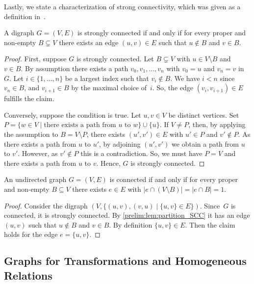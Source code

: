 Lastly, we state a characterization of strong connectivity, which was given as a definition in~\cite[Def.~2]{DBLP:journals/jalc/GonzeJ19}.

\begin{lemma}
	\label{prelim:lem:partition_SCC}
	A digraph $G = (V, E)$ is strongly connected if and only if for
	every proper and non-empty $B \subsetneq V$
	there exists an edge $(u,v) \in E$ such that $u \notin B$ and $v \in B$. 
\end{lemma}
\begin{proof}
	First, suppose $G$ is strongly connected. Let $B \subsetneq V$
	with $u \in V \setminus B$ and~$v \in B$.
	By assumption there exists a path $v_0, v_1, \ldots, v_n$
	with $v_0 = u$ and $v_n = v$ in $G$.
	Let $i \in \{1,\ldots,n\}$
	be a largest index such that $v_{i} \notin B$.
	We have $i < n$ since $v_n \in B$, 
	and $v_{i+1} \in B$ by the maximal choice of~$i$.
	So, the edge $(v_i, v_{i+1}) \in E$
	fulfills the claim.
		
	Conversely, suppose the condition is true.
	Let $u,v \in V$ be distinct vertices.
	Set $P = \{ w \in V \mid \text{there exists a path from $u$ to $w$} \} \cup \{u\}$.
	If $V \ne P$, then, by applying the assumption to $B = V \setminus P$,
	there exists $(u', v') \in E$
	with $u' \in P$ and $v' \notin P$.
	As there exists a path from $u$ to $u'$,
	by adjoining $(u', v')$ we obtain a path from $u$ to $v'$.
	However, as $v' \notin P$ this is a contradiction.
	So, we must have $P = V$
	and there exists a path from $u$ to $v$.
	Hence, $G$ is strongly connected.
\end{proof} 

\begin{corollary}
	An undirected graph $G = (V,E)$ is connected
	if and only if for every proper and non-empty $B \subseteq V$
	there exists $e \in E$ with $|e \cap (V \setminus B)| = |e \cap B| = 1$.	
\end{corollary}
\begin{proof}
	Consider the digraph $(V, \{ (u,v), (v,u) \mid \{u,v\} \in E \})$.
	Since~$G$ is connected, it is strongly connected.
	By \cref{prelim:lem:partition_SCC} 
	it has an edge $(u,v)$ such that $u \notin B$ and $v \in B$.
	By definition $\{u,v\} \in E$.
	Then the claim holds for the edge $e = \{u,v\}$.
\end{proof}

\subsection{Graphs for Transformations and Homogeneous Relations}
\label{prelim:sec:graphs:funcgraph}

